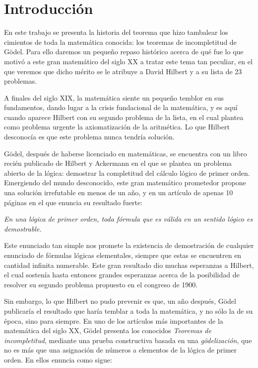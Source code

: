 %


\chapter{Introducción}

En este trabajo se presenta la historia del teorema que hizo tambalear los cimientos de toda la matemática conocida:
los teoremas de incompletitud de Gödel. Para ello daremos un pequeño repaso histórico acerca de qué fue lo 
que motivó a este gran matemático del siglo XX a tratar este tema tan peculiar, en el que veremos que dicho 
mérito se le atribuye a David Hilbert y a su lista de 23 problemas.

A finales del siglo XIX, la matemática  siente un pequeño temblor en sus fundamentos, dando lugar a la crisis fundacional
de la matemática, y es aquí cuando aparece Hilbert con su segundo problema de la lista, en el cual plantea como 
problema urgente la axiomatización de la aritmética. Lo que Hilbert desconocía es que este problema nunca tendría solución.

Gödel, después de haberse licenciado en matemáticas, se encuentra con un libro recién publicado de Hilbert y Ackermann en el que se plantea
un problema abierto de la lógica: demostrar la completitud del cálculo lógico 
de primer orden. Emergiendo del mundo desconocido, este gran matemático prometedor propone una solución irrefutable en menos de un año, 
y en un artículo de apenas 10 páginas en el que enuncia su resultado fuerte:

\begin{center}
    \textit{En una lógica de primer orden, toda fórmula que es válida en un sentido lógico es demostrable.}
\end{center}

Este enunciado tan simple nos promete la existencia de demostración de cualquier enunciado de fórmulas lógicas elementales, siempre
que estas se encuentren en cantidad infinita numerable. Este gran resultado dio muchas esperanzas a Hilbert, el cual sostenía 
hasta entonces grandes esperanzas acerca de la posibilidad de resolver su segundo problema propuesto en el congreso de 1900.

Sin embargo, lo que Hilbert no pudo prevenir es que, un año después, Gödel publicaría el resultado que haría temblar a toda la matemática, 
y no sólo la de su época, sino para siempre. En uno de los artículos más importantes de la matemática del siglo XX, Gödel presenta los 
conocidos \textit{Teoremas de incompletitud}, mediante una prueba constructiva basada en una \textit{gödelización}, que no es más que una asignación
de números a elementos de la lógica de primer orden. En ellos enuncia como sigue:


